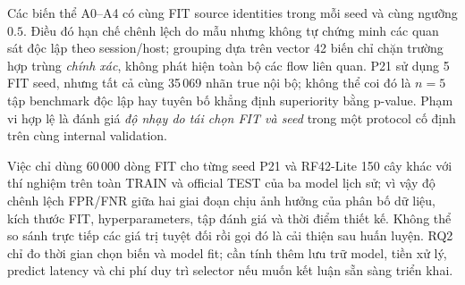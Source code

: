 Các biến thể A0--A4 có cùng FIT source identities trong mỗi seed và cùng ngưỡng $0.5$. Điều đó hạn chế chênh lệch do mẫu nhưng không tự chứng minh các quan sát độc lập theo session/host; grouping dựa trên vector 42 biến chỉ chặn trường hợp trùng \emph{chính xác}, không phát hiện toàn bộ các flow liên quan. P21 sử dụng 5 FIT seed, nhưng tất cả cùng 35\,069 nhãn true nội bộ; không thể coi đó là $n=5$ tập benchmark độc lập hay tuyên bố khẳng định superiority bằng p-value. Phạm vi hợp lệ là đánh giá \emph{độ nhạy do tái chọn FIT và seed} trong một protocol cố định trên cùng internal validation.

Việc chỉ dùng 60\,000 dòng FIT cho từng seed P21 và RF42-Lite 150 cây khác với thí nghiệm trên toàn TRAIN và official TEST của ba model lịch sử; vì vậy độ chênh lệch FPR/FNR giữa hai giai đoạn chịu ảnh hưởng của phân bố dữ liệu, kích thước FIT, hyperparameters, tập đánh giá và thời điểm thiết kế. Không thể so sánh trực tiếp các giá trị tuyệt đối rồi gọi đó là cải thiện sau huấn luyện. RQ2 chỉ đo thời gian chọn biến và model fit; cần tính thêm lưu trữ model, tiền xử lý, predict latency và chi phí duy trì selector nếu muốn kết luận sẵn sàng triển khai.
